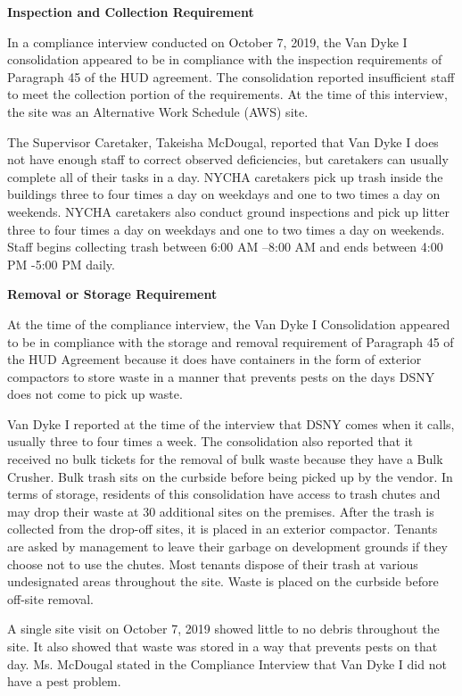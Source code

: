 

\textbf{Inspection and Collection Requirement}

In a compliance interview conducted on October 7, 2019, the Van Dyke I consolidation appeared to be in compliance with the inspection requirements of Paragraph 45 of the HUD agreement. The consolidation reported insufficient staff to meet the collection portion of the requirements. At the time of this interview, the site was an Alternative Work Schedule (AWS) site. 

The Supervisor Caretaker, Takeisha McDougal, reported that Van Dyke I does not have enough staff to correct observed deficiencies, but caretakers can usually complete all of their tasks in a day. NYCHA caretakers pick up trash inside the buildings three to four times a day on weekdays and one to two times a day on weekends. NYCHA caretakers also conduct ground inspections and pick up litter three to four times a day on weekdays and one to two times a day on weekends. Staff begins collecting trash between 6:00 AM --8:00 AM and ends between 4:00 PM -5:00 PM daily. 

\textbf{Removal or Storage Requirement} 

At the time of the compliance interview, the Van Dyke I Consolidation appeared to be in compliance with the storage and removal requirement of Paragraph 45 of the HUD Agreement because it does have containers in the form of exterior compactors to store waste in a manner that prevents pests on the days DSNY does not come to pick up waste. 

Van Dyke I reported at the time of the interview that DSNY comes when it calls, usually three to four times a week. The consolidation also reported that it received no bulk tickets for the removal of bulk waste because they have a Bulk Crusher. Bulk trash sits on the curbside before being picked up by the vendor. In terms of storage, residents of this consolidation have access to trash chutes and may drop their waste at 30 additional sites on the premises. After the trash is collected from the drop-off sites, it is placed in an exterior compactor. Tenants are asked by management to leave their garbage on development grounds if they choose not to use the chutes. Most tenants dispose of their trash at various undesignated areas throughout the site. Waste is placed on the curbside before off-site removal.

A single site visit on October 7, 2019 showed little to no debris throughout the site. It also showed that waste was stored in a way that prevents pests on that day. Ms. McDougal stated in the Compliance Interview that Van Dyke I did not have a pest problem.


